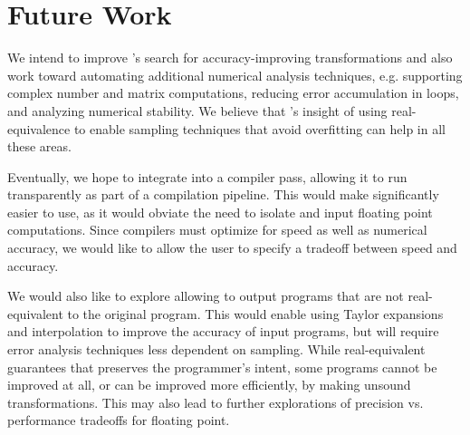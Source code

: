 \documentclass[paper.tex]{subfiles}
\begin{document}
\section{Future Work}
\label{sec:futurework}

We intend to improve \casio's search for accuracy-improving
transformations and also work toward automating additional numerical
analysis techniques, e.g. supporting complex number and matrix
computations, reducing error accumulation in loops, and analyzing
numerical stability.  We believe that \casio's insight of using
real-equivalence to enable sampling techniques that avoid overfitting
can help in all these areas.

Eventually, we hope to integrate \casio into a compiler pass, allowing
it to run transparently as part of a compilation pipeline.  This would
make \casio significantly easier to use, as it would obviate the need
to isolate and input floating point computations.  Since compilers
must optimize for speed as well as numerical accuracy, we would like
to allow the user to specify a tradeoff between speed and accuracy.

We would also like to explore allowing \casio to output programs that
are not real-equivalent to the original program.  This would enable
using Taylor expansions and interpolation to improve the accuracy of
input programs, but will require error analysis techniques less
dependent on sampling.  While real-equivalent guarantees that \casio
preserves the programmer's intent, some programs cannot be improved at
all, or can be improved more efficiently, by making unsound
transformations.  This may also lead to further explorations of
precision vs. performance tradeoffs for floating point.
\end{document}
